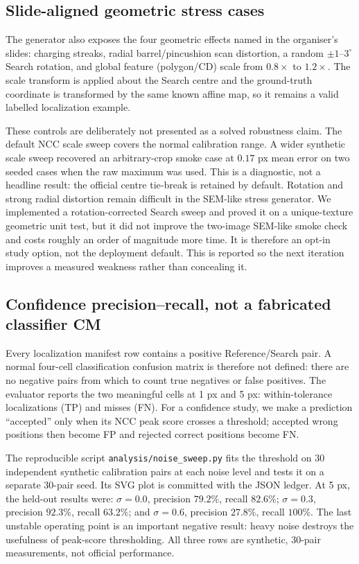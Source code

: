 \documentclass[11pt]{article}
\begin{document}
\subsection{Slide-aligned geometric stress cases}
The generator also exposes the four geometric effects named in the organiser's
slides: charging streaks, radial barrel/pincushion scan distortion, a random
$\pm1$--$3^\circ$ Search rotation, and global feature (polygon/CD) scale from
$0.8\times$ to $1.2\times$.  The scale transform is applied about the Search
centre and the ground-truth coordinate is transformed by the same known affine
map, so it remains a valid labelled localization example.

These controls are deliberately not presented as a solved robustness claim.
The default NCC scale sweep covers the normal calibration range. A wider
synthetic scale sweep recovered an arbitrary-crop smoke case at $0.17$ px mean
error on two seeded cases when the raw maximum was used. This is a diagnostic,
not a headline result: the official centre tie-break is retained by default.
Rotation and strong radial distortion remain difficult in the SEM-like stress
generator. We implemented a rotation-corrected Search sweep and proved it on a
unique-texture geometric unit test, but it did not improve the two-image
SEM-like smoke check and costs roughly an order of magnitude more time. It is
therefore an opt-in study option, not the deployment default. This is reported
so the next iteration improves a measured weakness rather than concealing it.

\subsection{Confidence precision--recall, not a fabricated classifier CM}
Every localization manifest row contains a positive Reference/Search pair. A
normal four-cell classification confusion matrix is therefore not defined:
there are no negative pairs from which to count true negatives or false
positives. The evaluator reports the two meaningful cells at 1 px and 5 px:
within-tolerance localizations (TP) and misses (FN). For a confidence study, we
make a prediction ``accepted'' only when its NCC peak score crosses a threshold;
accepted wrong positions then become FP and rejected correct positions become FN.

The reproducible script \texttt{analysis/noise\_sweep.py} fits the threshold on
30 independent synthetic calibration pairs at each noise level and tests it on
a separate 30-pair seed. Its SVG plot is committed with the JSON ledger. At 5 px,
the held-out results were: $\sigma=0.0$, precision $79.2\%$, recall $82.6\%$;
$\sigma=0.3$, precision $92.3\%$, recall $63.2\%$; and $\sigma=0.6$,
precision $27.8\%$, recall $100\%$. The last unstable operating point is an
important negative result: heavy noise destroys the usefulness of peak-score
thresholding. All three rows are synthetic, 30-pair measurements, not official
performance.
\end{document}
